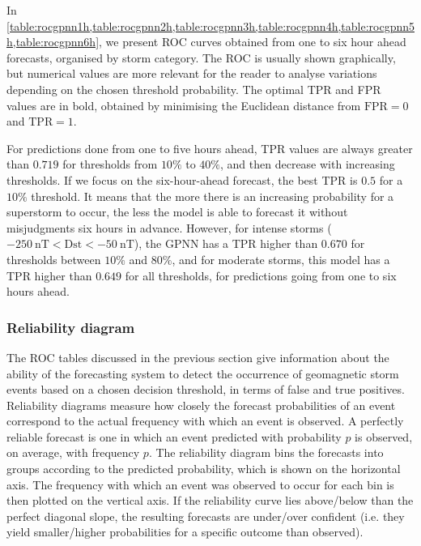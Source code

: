 In \cref{table:rocgpnn1h,table:rocgpnn2h,table:rocgpnn3h,table:rocgpnn4h,table:rocgpnn5h,table:rocgpnn6h}, 
we present ROC curves obtained from one to six hour ahead forecasts, organised by storm category. 
The ROC is usually shown graphically, but numerical values are more relevant for the reader to 
analyse variations depending on the chosen threshold probability. The optimal TPR and FPR values 
are in bold, obtained by minimising the Euclidean distance from $\text{FPR} = 0$ and 
$\text{TPR} = 1$.

For predictions done from one to five hours ahead, TPR values are always greater than $0.719$ for 
thresholds from $10\%$  to $40\%$, and then decrease with increasing thresholds. If we focus on the 
six-hour-ahead forecast, the best TPR is $0.5$ for a $10\%$ threshold. It means that the more there 
is an increasing probability for a superstorm to occur, the less the model is able to forecast it 
without misjudgments six hours in advance. However, for intense storms 
($\SI{-250}{\nano\tesla} < \mathrm{Dst} < \SI{-50}{\nano\tesla}$), the GPNN has a TPR higher 
than $0.670$ for thresholds between $10\%$ and $80\%$, and for moderate storms, this model has 
a TPR higher than $0.649$ for all thresholds, for predictions going from one to six hours ahead. 


\subsubsection{Reliability diagram}


The ROC tables discussed in the previous section give information about the ability of the 
forecasting system to detect the occurrence of geomagnetic storm events based on a chosen decision 
threshold, in terms of false and true positives. Reliability diagrams measure how closely the 
forecast probabilities of an event correspond to the actual frequency with which an event is 
observed. A perfectly reliable forecast is one in which an event predicted with probability $p$ is 
observed, on average, with frequency $p$. The reliability diagram bins the forecasts into groups 
according to the predicted probability, which is shown on the horizontal axis. The frequency with 
which an event was observed to occur for each bin is then plotted on the vertical axis. If the 
reliability curve lies above/below than the perfect diagonal slope, the resulting forecasts are 
under/over confident 
(i.e. they yield  smaller/higher probabilities for a specific outcome than observed). 

